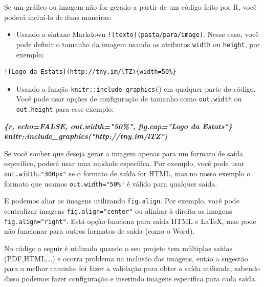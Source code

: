 \documentclass[
]{book}
\newenvironment{Shaded}{\begin{snugshade}}{\end{snugshade}}
\newcommand{\InformationTok}[1]{\textcolor[rgb]{0.56,0.35,0.01}{\textbf{\textit{#1}}}}
\providecommand{\tightlist}{%
  \setlength{\itemsep}{0pt}\setlength{\parskip}{0pt}}
\begin{document}
Se um gráfico ou imagem não for gerado a partir de um código feito por R, você poderá incluí-lo de duas maneiras:

\begin{itemize}
\tightlist
\item
  Usando a sintaxe Markdown \texttt{!{[}texto{]}(pasta/para/image)}. Nesse caso, você pode definir o tamanho da imagem usando os atributos \texttt{width} ou \texttt{height}, por exemplo:
\end{itemize}

\begin{verbatim}
![Logo da Estats](http://tny.im/lTZ){width=50%}
\end{verbatim}

\begin{itemize}
\tightlist
\item
  Usando a função \texttt{knitr::include\_graphics(}) em qualquer parte do código. Você pode usar opções de configuração de tamanho como \texttt{out.width} ou \texttt{out.height} para esse exemplo:
\end{itemize}

\begin{Shaded}
\begin{Highlighting}[]
\InformationTok{\textasciigrave{}\textasciigrave{}\textasciigrave{}\{r, echo=FALSE, out.width="50\%", fig.cap="Logo da Estats"\}}
\InformationTok{knitr::include\_graphics("http://tny.im/lTZ")}
\InformationTok{\textasciigrave{}\textasciigrave{}\textasciigrave{}}
\end{Highlighting}
\end{Shaded}

Se você souber que deseja gerar a imagem apenas para um formato de saída específico, poderá usar uma unidade específica. Por exemplo, você pode usar \texttt{out.width="300px"} se o formato de saída for HTML, mas no nosso exemplo o formato que usamos \texttt{out.width="50\%"} é válido para qualquer saída.

E podemos aliar as imagens utilizando \texttt{fig.align}. Por exemplo, você pode centralizar imagens \texttt{fig.align="center"} ou alinhar à direita as imagens \texttt{fig.align="right\textquotesingle{}"}. Está opção funciona para saída HTML e LaTeX, mas pode não funcionar para outros formatos de saída (como o Word).

No código a seguir é utilizado quando o seu projeto tem múltiplas saídas (PDF,HTML,\ldots) e ocorra problema na inclusão das imagens, então a sugestão para o melhor caminho foi fazer a validação para obter a saída utilizada, sabendo disso podemos fazer configuração e inserindo imagens especifica para cada saída.
\end{document}
